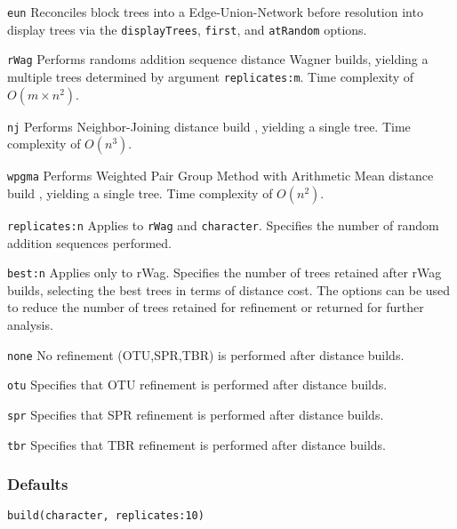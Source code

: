 \documentclass[11pt]{article}
\begin{document}
		\smallskip
		\smallskip
		\noindent \texttt{eun} Reconciles block trees into a  Edge-Union-Network \citep{MiyagiandWheeler2019, Wheeler2022} before resolution into display trees via the \texttt{displayTrees}, \texttt{first},
		and \texttt{atRandom} options.
		
		\smallskip
		\noindent \texttt{rWag} Performs randoms addition sequence distance Wagner builds, yielding a multiple trees determined 
		by argument \texttt{replicates:m}.  Time complexity of $O(m \times n^2)$.
		
		\smallskip		
		\noindent \texttt{nj} Performs Neighbor-Joining distance build \citep{Saitou1987}, yielding a single tree.  Time complexity of $O(n^3)$.
		
		\smallskip		
		\noindent \texttt{wpgma} Performs Weighted Pair Group Method with Arithmetic Mean distance build \citep{SokalandMichener1958}, 
		yielding a single tree.  Time complexity of $O(n^2)$.
		
		\smallskip		
		\noindent \texttt{replicates:n}  Applies to \texttt{rWag} and \texttt{character}.  Specifies the number of random addition sequences performed. 
		
		\smallskip		
		\noindent \texttt{best:n} Applies only to rWag.  Specifies the number of trees retained after rWag builds, selecting 
		the best trees in terms of distance cost.  The options can be used to reduce
		the number of trees retained for refinement or returned for further analysis.  
		
		\smallskip		
		\noindent \texttt{none} No refinement (OTU,SPR,TBR) is performed after distance builds.
		
		\smallskip		
		\noindent \texttt{otu} Specifies that OTU refinement \citep{Wheeler2021} is performed after distance builds.
		
		\smallskip		
		\noindent \texttt{spr} Specifies that SPR refinement \citep{Dayhoff1969} is performed after distance builds.

		\smallskip		
		\noindent \texttt{tbr} Specifies that TBR refinement \citep{Farris1988, swofford1990a} is performed after distance builds.

		\subsubsection{Defaults}
			\texttt{build(character, replicates:10)}
\end{document}

